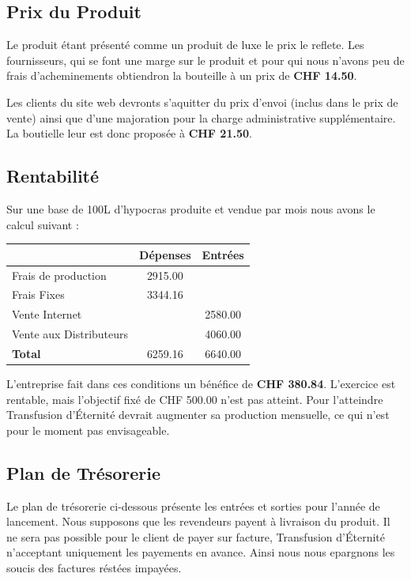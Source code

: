 \documentclass[10pt,a4paper]{article}
\newcommand{\tde}{Transfusion d'Éternité}
\begin{document}
\subsection{Prix du Produit}
Le produit étant présenté comme un produit de luxe le prix le reflete.
Les fournisseurs, qui se font une marge sur le produit et pour qui nous n'avons peu de frais d'acheminements obtiendron la bouteille à un prix de \textbf{CHF 14.50}.

Les clients du site web devronts s'aquitter du prix d'envoi (inclus dans le prix de vente) ainsi que d'une majoration pour la charge administrative supplémentaire.
La boutielle leur est donc proposée à \textbf{CHF 21.50}.
\subsection{Rentabilité}
Sur une base de 100L d'hypocras produite et vendue par mois nous avons le calcul suivant :

\vspace{0.5cm}
\begin{tabular}{|l|S[table-format=3.2]|S[table-format=3.2]|}
\hline
& \textbf{Dépenses} & \textbf{Entrées} \\\hline
Frais de production & 2915.00 & \\
Frais Fixes & 3344.16 & \\
Vente Internet & & 2580.00 \\
Vente aux Distributeurs & & 4060.00 \\\hline
\textbf{Total} & 6259.16 & 6640.00 \\\hline
\end{tabular}

\vspace{0.5cm}
L'entreprise fait dans ces conditions un bénéfice de \textbf{CHF 380.84}.
L'exercice est rentable, mais l'objectif fixé de CHF 500.00 n'est pas atteint.
Pour l'atteindre \tde{} devrait augmenter sa production mensuelle, ce qui n'est pour le moment pas envisageable.
\subsection{Plan de Trésorerie}
Le plan de trésorerie ci-dessous présente les entrées et sorties pour l'année de lancement.
Nous supposons que les revendeurs payent à livraison du produit.
Il ne sera pas possible pour le client de payer sur facture, \tde{} n'acceptant uniquement les payements en avance.
Ainsi nous nous epargnons les soucis des factures réstées impayées.
\end{document}
